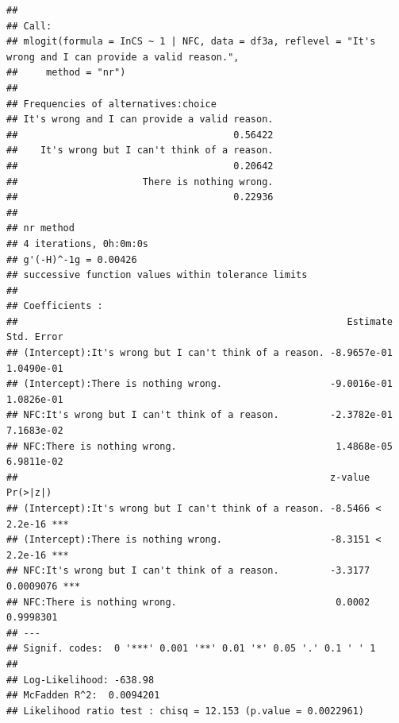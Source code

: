 \documentclass[
  american,
  man,floatsintext]{apa7}
\begin{document}
\begin{verbatim}
## 
## Call:
## mlogit(formula = InCS ~ 1 | NFC, data = df3a, reflevel = "It's wrong and I can provide a valid reason.", 
##     method = "nr")
## 
## Frequencies of alternatives:choice
## It's wrong and I can provide a valid reason. 
##                                      0.56422 
##    It's wrong but I can't think of a reason. 
##                                      0.20642 
##                      There is nothing wrong. 
##                                      0.22936 
## 
## nr method
## 4 iterations, 0h:0m:0s 
## g'(-H)^-1g = 0.00426 
## successive function values within tolerance limits 
## 
## Coefficients :
##                                                          Estimate  Std. Error
## (Intercept):It's wrong but I can't think of a reason. -8.9657e-01  1.0490e-01
## (Intercept):There is nothing wrong.                   -9.0016e-01  1.0826e-01
## NFC:It's wrong but I can't think of a reason.         -2.3782e-01  7.1683e-02
## NFC:There is nothing wrong.                            1.4868e-05  6.9811e-02
##                                                       z-value  Pr(>|z|)    
## (Intercept):It's wrong but I can't think of a reason. -8.5466 < 2.2e-16 ***
## (Intercept):There is nothing wrong.                   -8.3151 < 2.2e-16 ***
## NFC:It's wrong but I can't think of a reason.         -3.3177 0.0009076 ***
## NFC:There is nothing wrong.                            0.0002 0.9998301    
## ---
## Signif. codes:  0 '***' 0.001 '**' 0.01 '*' 0.05 '.' 0.1 ' ' 1
## 
## Log-Likelihood: -638.98
## McFadden R^2:  0.0094201 
## Likelihood ratio test : chisq = 12.153 (p.value = 0.0022961)
\end{verbatim}
\end{document}
